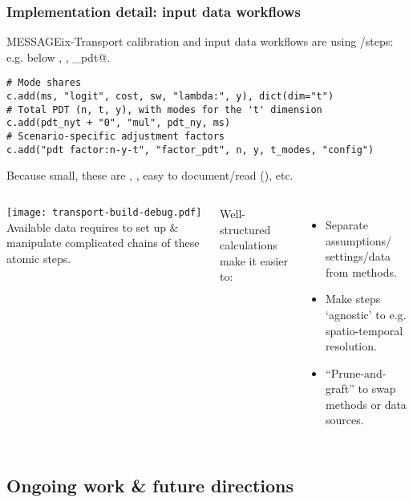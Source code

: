 \documentclass[12pt,aspectratio=169]{beamer}
\begin{document}
\begin{frame}
\frametitle{Implementation detail: input data workflows}

MESSAGEix-Transport calibration and input data workflows are  using /steps: e.g. below \verb@logit@, \verb@mul@, \verb@factor_pdt@.
\begin{verbatim}
# Mode shares
c.add(ms, "logit", cost, sw, "lambda:", y), dict(dim="t")
# Total PDT (n, t, y), with modes for the 't' dimension
c.add(pdt_nyt + "0", "mul", pdt_ny, ms)
# Scenario-specific adjustment factors
c.add("pdt factor:n-y-t", "factor_pdt", n, y, t_modes, "config")
\end{verbatim}

\medskip
Because small, these are , , easy to document/read (), etc.

\framebreak
\begin{columns}
\column[T]{0.6\paperwidth}
\texttt{[image: transport-build-debug.pdf]}
\column[T]{0.35\paperwidth}
Available data requires to set up \& manipulate complicated chains of these atomic steps.

\medskip
Well-structured calculations make it easier to:
\begin{itemize}
  \item Separate assumptions/ settings/data from methods.
  \item Make steps ‘agnostic’ to e.g. spatio-temporal resolution.
  \item “Prune-and-graft” to swap methods or data sources.
\end{itemize}
\end{columns}
\end{frame}

\subsection{Ongoing work \& future directions}
\end{document}
